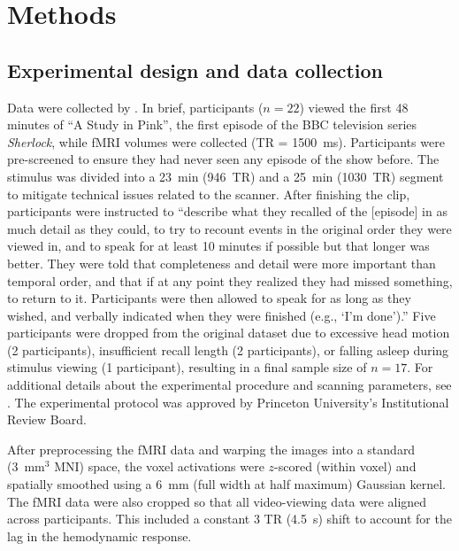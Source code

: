 \documentclass{article}
\begin{document}
\section*{Methods}
\label{sec:methods}

\subsection*{Experimental design and data collection}
Data were collected by \cite{ChenEtal17}.  In brief, participants ($n=22$) viewed the first 48 minutes of ``A Study in Pink'', the first episode of the BBC television series \textit{Sherlock}, while fMRI volumes were collected (TR = 1500~ms).  Participants were pre-screened to ensure they had never seen any episode of the show before.  The stimulus was divided into a 23~min (946~TR) and a 25~min (1030~TR) segment to mitigate technical issues related to the scanner.  After finishing the clip, participants were instructed to \citep[quoting from][]{ChenEtal17} ``describe what they recalled of the [episode] in as much detail as they could, to try to recount events in the original order they were viewed in, and to speak for at least 10 minutes if possible but that longer was better. They were told that completeness and detail were more important than temporal order, and that if at any point they realized they had missed something, to return to it. Participants were then allowed to speak for as long as they wished, and verbally indicated when they were finished (e.g., `I’m done').''  Five participants were dropped from the original dataset due to excessive head motion (2 participants), insufficient recall length (2 participants), or falling asleep during stimulus viewing (1 participant), resulting in a final sample size of $n=17$.  For additional details about the experimental procedure and scanning parameters, see \cite{ChenEtal17}.  The experimental protocol was approved by Princeton University's Institutional Review Board.

After preprocessing the fMRI data and warping the images into a standard (3~mm$^3$ MNI) space, the voxel activations were $z$-scored (within voxel) and spatially smoothed using a 6~mm (full width at half maximum) Gaussian kernel.  The fMRI data were also cropped so that all video-viewing data were aligned across participants.  This included a constant 3 TR (4.5~s) shift to account for the lag in the hemodynamic response.  \citep[All of these preprocessing steps followed][where additional details may be found.]{ChenEtal17}
\end{document}
